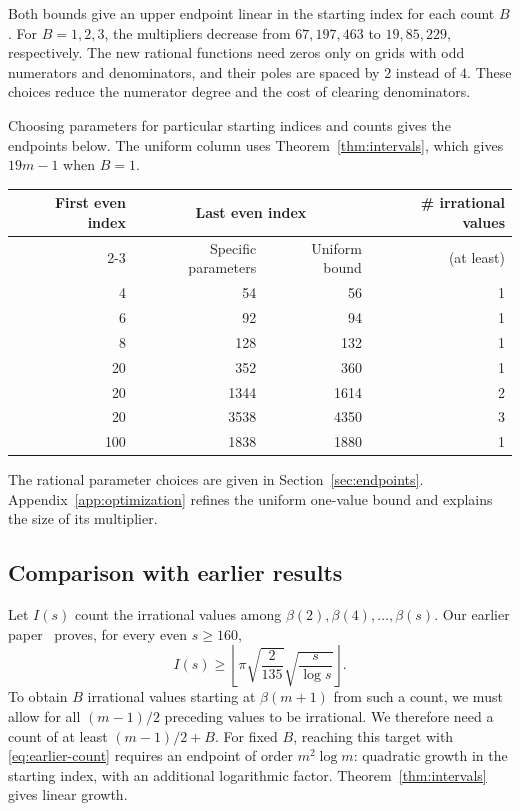 Both bounds give an upper endpoint linear in the starting
index for each count $B$. For $B=1,2,3$, the multipliers decrease
from $67,197,463$ to $19,85,229$, respectively.
The new rational functions need zeros only on grids with odd
numerators and denominators, and their poles are spaced by $2$
instead of $4$. These choices reduce the numerator degree and
the cost of clearing denominators.

Choosing parameters for particular starting indices and counts
gives the endpoints below. The uniform column uses
Theorem~\ref{thm:intervals}, which gives $19m-1$ when $B=1$.
\begin{center}
\begin{tabular}{@{}rrrr@{}}
\toprule
First even index&\multicolumn{2}{c}{Last even index}&\# irrational values\\
\cmidrule(lr){2-3}
&Specific parameters&Uniform bound&(at least)\\
\midrule
4&54&56&1\\
6&92&94&1\\
8&128&132&1\\
20&352&360&1\\
20&1344&1614&2\\
20&3538&4350&3\\
100&1838&1880&1\\
\bottomrule
\end{tabular}
\end{center}
The rational parameter choices are given in
Section~\ref{sec:endpoints}.
Appendix~\ref{app:optimization} refines the uniform one-value bound
and explains the size of its multiplier.

\subsection{Comparison with earlier results}

Let $I(s)$ count the irrational values among
$\beta(2),\beta(4),\ldots,\beta(s)$. Our earlier paper~\cite{Tcount}
proves, for every even $s\ge160$,
\begin{equation}\label{eq:earlier-count}
 I(s)\ge\left\lfloor
 \pi\sqrt{\frac{2}{135}}\sqrt{\frac{s}{\log s}}
 \right\rfloor.
\end{equation}
To obtain $B$ irrational values starting at $\beta(m+1)$ from
such a count, we must allow for all $(m-1)/2$ preceding values
to be irrational. We therefore need a count of at least
$(m-1)/2+B$. For fixed $B$, reaching this target with
\eqref{eq:earlier-count} requires an endpoint of order
$m^2\log m$: quadratic growth in the starting index, with an
additional logarithmic factor. Theorem~\ref{thm:intervals}
gives linear growth.

